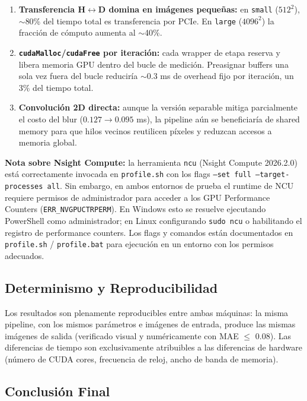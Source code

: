 \documentclass[12pt,a4paper]{article}
\begin{document}
\begin{enumerate}
  \item \textbf{Transferencia H$\leftrightarrow$D domina en im\'agenes peque\~nas:} en \texttt{small} ($512^2$), $\sim$80\% del tiempo total es transferencia por PCIe. En \texttt{large} ($4096^2$) la fracci\'on de c\'omputo aumenta al $\sim$40\%.
  \item \textbf{\texttt{cudaMalloc}/\texttt{cudaFree} por iteraci\'on:} cada wrapper de etapa reserva y libera memoria GPU dentro del bucle de medici\'on. Preasignar buffers una sola vez fuera del bucle reducir\'ia $\sim$0.3 ms de overhead fijo por iteraci\'on, un 3\% del tiempo total.
  \item \textbf{Convoluci\'on 2D directa:} aunque la versi\'on separable mitiga parcialmente el costo del blur ($0.127 \rightarrow 0.095$ ms), la pipeline a\'un se beneficiar\'ia de shared memory para que hilos vecinos reutilicen p\'ixeles y reduzcan accesos a memoria global.
\end{enumerate}

\textbf{Nota sobre Nsight Compute:} la herramienta \texttt{ncu} (Nsight Compute 2026.2.0) est\'a correctamente invocada en \texttt{profile.sh} con los flags \texttt{--set full --target-processes all}. Sin embargo, en ambos entornos de prueba el runtime de NCU requiere permisos de administrador para acceder a los GPU Performance Counters (\texttt{ERR\_NVGPUCTRPERM}). En Windows esto se resuelve ejecutando PowerShell como administrador; en Linux configurando \texttt{sudo ncu} o habilitando el registro de performance counters. Los flags y comandos est\'an documentados en \texttt{profile.sh} / \texttt{profile.bat} para ejecuci\'on en un entorno con los permisos adecuados.

\subsection{Determinismo y Reproducibilidad}

Los resultados son plenamente reproducibles entre ambas m\'aquinas: la misma pipeline, con los mismos par\'ametros e im\'agenes de entrada, produce las mismas im\'agenes de salida (verificado visual y num\'ericamente con MAE $\leq$ 0.08). Las diferencias de tiempo son exclusivamente atribuibles a las diferencias de hardware (n\'umero de CUDA cores, frecuencia de reloj, ancho de banda de memoria).

\subsection{Conclusi\'on Final}
\end{document}
